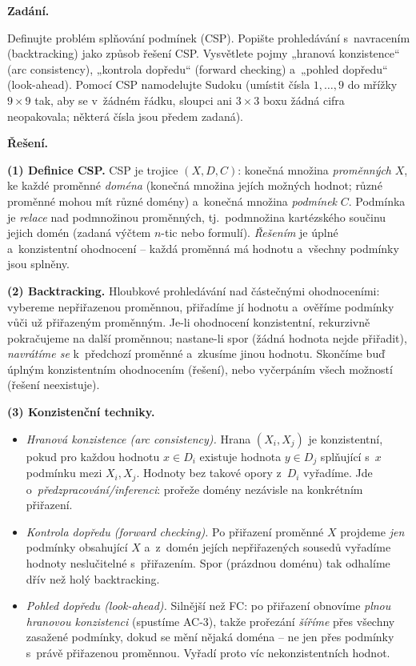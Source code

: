 \begin{priklad}
\par
\textbf{Zadání.}\par
Definujte problém splňování podmínek (CSP). Popište prohledávání s~navracením (backtracking) jako způsob řešení CSP. Vysvětlete pojmy „hranová konzistence`` (arc consistency), „kontrola dopředu`` (forward checking) a~„pohled dopředu`` (look-ahead). Pomocí CSP namodelujte Sudoku (umístit čísla $1,\dots,9$ do mřížky $9\times 9$ tak, aby se v~žádném řádku, sloupci ani $3\times 3$ boxu žádná cifra neopakovala; některá čísla jsou předem zadaná).

\medskip
\textbf{Řešení.}

\textbf{(1) Definice CSP.} CSP je trojice $(X,D,C)$: konečná množina \emph{proměnných} $X$, ke každé proměnné \emph{doména} (konečná množina jejích možných hodnot; různé proměnné mohou mít různé domény) a~konečná množina \emph{podmínek} $C$. Podmínka je \emph{relace} nad podmnožinou proměnných, tj.\ podmnožina kartézského součinu jejich domén (zadaná výčtem $n$-tic nebo formulí). \emph{Řešením} je úplné a~konzistentní ohodnocení -- každá proměnná má hodnotu a~všechny podmínky jsou splněny.

\textbf{(2) Backtracking.} Hloubkové prohledávání nad částečnými ohodnoceními: vybereme nepřiřazenou proměnnou, přiřadíme jí hodnotu a~ověříme podmínky vůči už přiřazeným proměnným. Je-li ohodnocení konzistentní, rekurzivně pokračujeme na další proměnnou; nastane-li spor (žádná hodnota nejde přiřadit), \emph{navrátíme se} k~předchozí proměnné a~zkusíme jinou hodnotu. Skončíme buď úplným konzistentním ohodnocením (řešení), nebo vyčerpáním všech možností (řešení neexistuje).

\textbf{(3) Konzistenční techniky.}
\begin{itemize}
  \item \emph{Hranová konzistence (arc consistency).} Hrana $(X_i,X_j)$ je konzistentní, pokud pro každou hodnotu $x\in D_i$ existuje hodnota $y\in D_j$ splňující s~$x$ podmínku mezi $X_i,X_j$. Hodnoty bez takové opory z~$D_i$ vyřadíme. Jde o~\emph{předzpracování/inferenci}: prořeže domény nezávisle na konkrétním přiřazení.
  \item \emph{Kontrola dopředu (forward checking).} Po přiřazení proměnné $X$ projdeme \emph{jen} podmínky obsahující $X$ a~z~domén jejích nepřiřazených sousedů vyřadíme hodnoty neslučitelné s~přiřazením. Spor (prázdnou doménu) tak odhalíme dřív než holý backtracking.
  \item \emph{Pohled dopředu (look-ahead).} Silnější než FC: po přiřazení obnovíme \emph{plnou hranovou konzistenci} (spustíme AC-3), takže prořezání \emph{šíříme} přes všechny zasažené podmínky, dokud se mění nějaká doména -- ne jen přes podmínky s~právě přiřazenou proměnnou. Vyřadí proto víc nekonzistentních hodnot.
\end{itemize}


\end{priklad}

